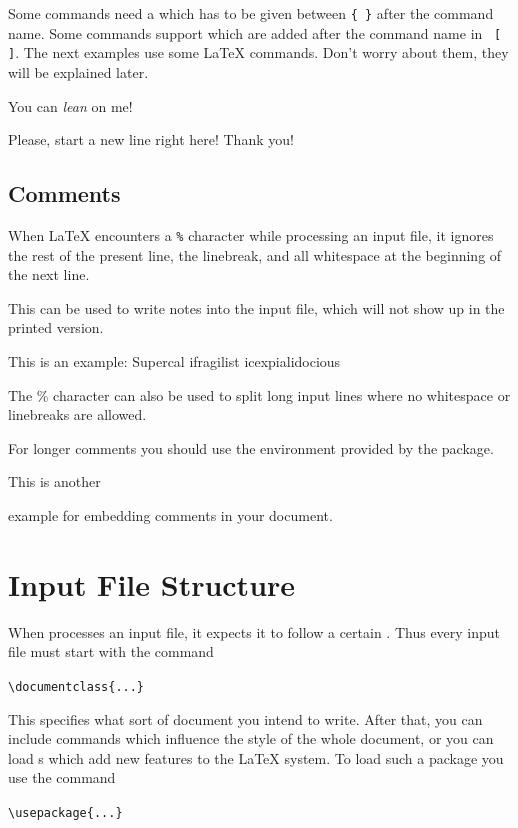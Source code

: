 Some commands need a  which has to be given between
 \verb|{ }| after the command name. Some commands support
 which are added after the command name in
~\verb|[ ]|. The next examples use some \LaTeX{}
commands. Don't worry about them, they will be explained later.

\begin{example}
You can \textsl{lean} on me!
\end{example}
\begin{example}
Please, start a new line
right here!\newline
Thank you!
\end{example}

\subsection{Comments}

When \LaTeX{} encounters a \verb|%| character while processing an input file,
it ignores the rest of the present line, the linebreak, and all
whitespace at the beginning of the next line.

This can be used to write notes into the input file, which will not show up
in the printed version.

\begin{example}
This is an %
example: Supercal%
              ifragilist%
    icexpialidocious
\end{example}

The \% character can also be used to split long input lines where no
whitespace or linebreaks are allowed.

For longer comments you should use the  environment
provided by the  package.
\begin{example}
This is another

example for embedding comments in your document.
\end{example}

\section{Input File Structure}

When \LaTeXe{} processes an input file, it expects it to follow a
certain . Thus every input file must start with the
command
\begin{code}
\verb|\documentclass{...}|
\end{code}
This specifies what sort of document you intend to write. After that,
you can include commands which influence the style of the whole
document, or you can load s which add new
features to the \LaTeX{} system. To load such a package you use the
command
\begin{code}
\verb|\usepackage{...}|
\end{code}

